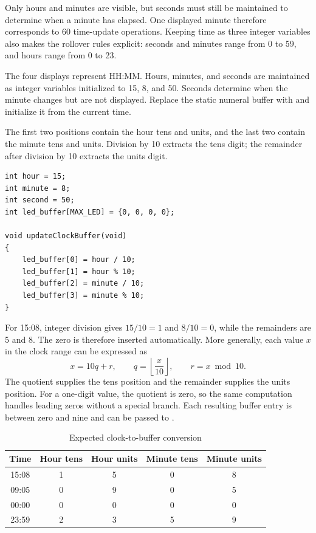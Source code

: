 \documentclass[a4paper]{article}
\newcommand{\code}[1]{\texttt{\detokenize{#1}}}
\begin{document}
Only hours and minutes are visible, but seconds must still be maintained to
determine when a minute has elapsed. One displayed minute therefore corresponds
to 60 time-update operations. Keeping time as three integer variables also
makes the rollover rules explicit: seconds and minutes range from 0 to 59,
and hours range from 0 to 23.

The four displays represent HH:MM. Hours, minutes, and seconds are maintained
as integer variables initialized to 15, 8, and 50. Seconds determine when the
minute changes but are not displayed. Replace the static numeral buffer with
\code{{0, 0, 0, 0}} and initialize it from the current time.

The first two positions contain the hour tens and units, and the last two
contain the minute tens and units. Division by 10 extracts the tens digit;
the remainder after division by 10 extracts the units digit.
\par\noindent\begin{minipage}{\linewidth}
\begin{lstlisting}[caption={Clock variables and updateClockBuffer function}]
int hour = 15;
int minute = 8;
int second = 50;
int led_buffer[MAX_LED] = {0, 0, 0, 0};

void updateClockBuffer(void)
{
    led_buffer[0] = hour / 10;
    led_buffer[1] = hour % 10;
    led_buffer[2] = minute / 10;
    led_buffer[3] = minute % 10;
}
\end{lstlisting}
\end{minipage}\par
For 15:08, integer division gives \(15/10=1\) and \(8/10=0\), while the
remainders are 5 and 8. The zero is therefore inserted automatically.
More generally, each value \(x\) in the clock range can be expressed as
\[
x=10q+r,\qquad q=\left\lfloor\frac{x}{10}\right\rfloor,
\qquad r=x\bmod10.
\]
The quotient supplies the tens position and the remainder supplies the units
position. For a one-digit value, the quotient is zero, so the same computation
handles leading zeros without a special branch. Each resulting buffer entry
is between zero and nine and can be passed to \code{display7SEG()}.
\begin{table}[htbp]
\centering
\caption{Expected clock-to-buffer conversion}
\label{tab:clock}
\begin{tabular}{ccccc}
\toprule
Time & Hour tens & Hour units & Minute tens & Minute units\\
\midrule
15:08 & 1 & 5 & 0 & 8\\
09:05 & 0 & 9 & 0 & 5\\
00:00 & 0 & 0 & 0 & 0\\
23:59 & 2 & 3 & 5 & 9\\
\bottomrule
\end{tabular}
\end{table}
\end{document}
